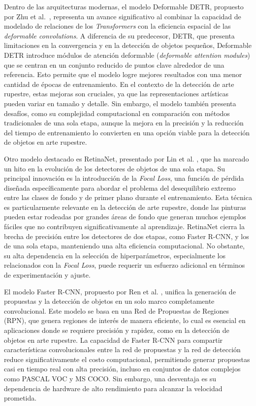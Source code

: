 Dentro de las arquitecturas modernas, el modelo Deformable DETR, propuesto por Zhu et al.~\cite{zhu2021deformable}, representa un avance significativo al combinar la capacidad de modelado de relaciones de los \textit{Transformers} con la eficiencia espacial de las \textit{deformable convolutions}. A diferencia de su predecesor, DETR, que presenta limitaciones en la convergencia y en la detección de objetos pequeños, Deformable DETR introduce módulos de atención deformable (\textit{deformable attention modules}) que se centran en un conjunto reducido de puntos clave alrededor de una referencia. Esto permite que el modelo logre mejores resultados con una menor cantidad de épocas de entrenamiento. En el contexto de la detección de arte rupestre, estas mejoras son cruciales, ya que las representaciones artísticas pueden variar en tamaño y detalle. Sin embargo, el modelo también presenta desafíos, como su complejidad computacional en comparación con métodos tradicionales de una sola etapa, aunque la mejora en la precisión y la reducción del tiempo de entrenamiento lo convierten en una opción viable para la detección de objetos en arte rupestre.

Otro modelo destacado es RetinaNet, presentado por Lin et al. \cite{lin2017focal}, que ha marcado un hito en la evolución de los detectores de objetos de una sola etapa. Su principal innovación es la introducción de la \textit{Focal Loss}, una función de pérdida diseñada específicamente para abordar el problema del desequilibrio extremo entre las clases de fondo y de primer plano durante el entrenamiento. Esta técnica es particularmente relevante en la detección de arte rupestre, donde las pinturas pueden estar rodeadas por grandes áreas de fondo que generan muchos ejemplos fáciles que no contribuyen significativamente al aprendizaje. RetinaNet cierra la brecha de precisión entre los detectores de dos etapas, como Faster R-CNN, y los de una sola etapa, manteniendo una alta eficiencia computacional. No obstante, su alta dependencia en la selección de hiperparámetros, especialmente los relacionados con la \textit{Focal Loss}, puede requerir un esfuerzo adicional en términos de experimentación y ajuste.

El modelo Faster R-CNN, propuesto por Ren et al. \cite{ren2015faster}, unifica la generación de propuestas y la detección de objetos en un solo marco completamente convolucional. Este modelo se basa en una Red de Propuestas de Regiones (RPN), que genera regiones de interés de manera eficiente, lo cual es esencial en aplicaciones donde se requiere precisión y rapidez, como en la detección de objetos en arte rupestre. La capacidad de Faster R-CNN para compartir características convolucionales entre la red de propuestas y la red de detección reduce significativamente el costo computacional, permitiendo generar propuestas casi en tiempo real con alta precisión, incluso en conjuntos de datos complejos como PASCAL VOC y MS COCO. Sin embargo, una desventaja es su dependencia de hardware de alto rendimiento para alcanzar la velocidad prometida.

